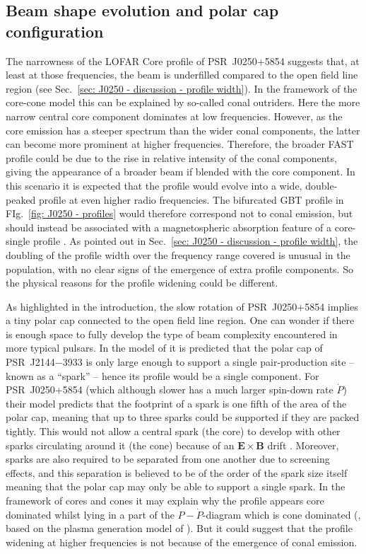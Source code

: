 \subsection{Beam shape evolution and polar cap configuration}
\label{sec: J0250 - discussion - beam shape}

The narrowness of the LOFAR Core profile of PSR~J0250+5854 suggests that, at least at those frequencies, the beam is underfilled compared to the open field line region (see Sec.~\ref{sec: J0250 - discussion - profile width}). In the framework of the core-cone model \citep[e.g.][]{Rxxx1983a,Rxxx1983b, RRxx1990, Rxxx1993} this can be explained by so-called conal outriders. Here the more narrow central core component dominates at low frequencies. However, as the core emission has a steeper spectrum than the wider conal components, the latter can become more prominent at higher frequencies. Therefore, the broader FAST profile could be due to the rise in relative intensity of the conal components, giving the appearance of a broader beam if blended with the core component. In this scenario it is expected that the profile would evolve into a wide, double-peaked profile at even higher radio frequencies. The bifurcated GBT profile in FIg.~\ref{fig: J0250 - profiles} would therefore correspond not to conal emission, but should instead be associated with a magnetospheric absorption feature of a core-single profile \citep[e.g.][]{Rxxx1993}. As pointed out in Sec.~\ref{sec: J0250 - discussion - profile width}, the doubling of the profile width over the frequency range covered is unusual in the population, with no clear signs of the emergence of extra profile components. So the physical reasons for the profile widening could be different.

As highlighted in the introduction, the slow rotation of PSR~J0250+5854 implies a tiny polar cap connected to the open field line region. One can wonder if there is enough space to fully develop the type of beam complexity encountered in more typical pulsars. In the model of \citet{MBMA2020} it is predicted that the polar cap of PSR~J2144$-$3933 is only large enough to support a single pair-production site -- known as a ``spark'' -- hence its profile would be a single component. For PSR~J0250+5854 (which although slower has a much larger spin-down rate $\dot{P}$) their model predicts that the footprint of a spark is one fifth of the area of the polar cap, meaning that up to three sparks could be supported if they are packed tightly. This would not allow a central spark (the core) to develop with other sparks circulating around it (the cone) because of an $\mathbf{E}\times\mathbf{B}$ drift \citep{RSxx1975}. Moreover, sparks are also required to be separated from one another due to screening effects, and this separation is believed to be of the order of the spark size itself \citep[e.g.][]{GSxx2000} meaning that the polar cap may only be able to support a single spark. In the framework of cores and cones it may explain why the profile appears core dominated whilst lying in a part of the $P-\dot{P}$-diagram which is cone dominated (\citealt{ROWx2020}, based on the plasma generation model of \citealt{THxx2015}). But it could suggest that the profile widening at higher frequencies is not because of the emergence of conal emission.


